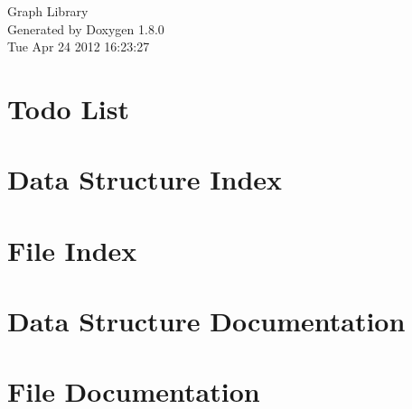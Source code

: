 \documentclass{book}
\begin{document}
\hypersetup{pageanchor=false,citecolor=blue}
\begin{titlepage}
\vspace*{7cm}
\begin{center}
{\Large Graph Library }\\
\vspace*{1cm}
{\large Generated by Doxygen 1.8.0}\\
\vspace*{0.5cm}
{\small Tue Apr 24 2012 16:23:27}\\
\end{center}
\end{titlepage}
\clearemptydoublepage
{}
\tableofcontents
\clearemptydoublepage
{}
\hypersetup{pageanchor=true,citecolor=blue}
\chapter{Todo List}
\label{todo}
\hypertarget{todo}{}

\chapter{Data Structure Index}

\chapter{File Index}

\chapter{Data Structure Documentation}







\chapter{File Documentation}





















\printindex
\end{document}
